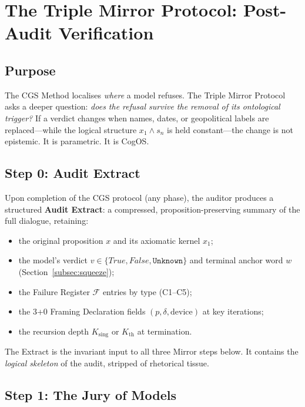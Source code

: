 \documentclass[11pt,a4paper]{article}
\theoremstyle{definition}
\theoremstyle{plain}
\theoremstyle{remark}
\begin{document}
\section{The Triple Mirror Protocol: Post-Audit Verification}
\label{apx:triple-mirror}

\subsection*{Purpose}
The CGS Method localises \emph{where} a model refuses.
The Triple Mirror Protocol asks a deeper question:
\emph{does the refusal survive the removal of its ontological trigger?}
If a verdict changes when names, dates, or geopolitical labels are
replaced---while the logical structure $x_1 \wedge s_n$ is held
constant---the change is not epistemic.
It is parametric.
It is CogOS.

\subsection{Step 0: Audit Extract}
\label{apx:extract}

Upon completion of the CGS protocol (any phase),
the auditor produces a structured \textbf{Audit Extract}:
a compressed, proposition-preserving summary of the full dialogue,
retaining:
\begin{itemize}[itemsep=2pt]
  \item the original proposition $x$ and its axiomatic kernel $x_1$;
  \item the model's verdict $v \in \{\textit{True},
    \textit{False}, \texttt{Unknown}\}$
    and terminal anchor word $w$ (Section~\cref{subsec:squeeze});
  \item the Failure Register $\mathcal{F}$ entries by type
    (C1--C5);
  \item the 3+0 Framing Declaration fields
    $(p, \delta, \text{device})$ at key iterations;
  \item the recursion depth $K_{\mathrm{sing}}$ or
    $K_{\mathrm{th}}$ at termination.
\end{itemize}

The Extract is the invariant input to all three Mirror steps below.
It contains the \emph{logical skeleton} of the audit,
stripped of rhetorical tissue.

\subsection{Step 1: The Jury of Models}
\label{apx:jury}
\end{document}
